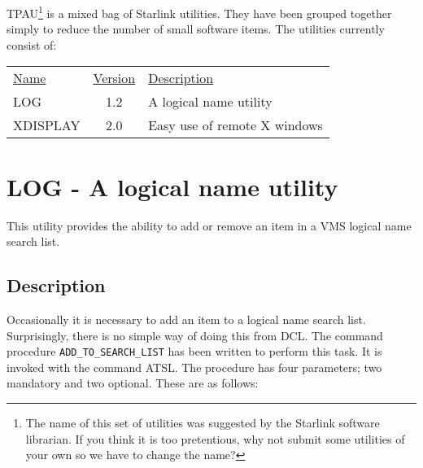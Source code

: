 TPAU\footnote{The name of this set of utilities was suggested by the Starlink
software librarian. If you think it is too pretentious, why not submit some
utilities of your own so we have to change the name?} is a mixed bag of
Starlink utilities. They have been grouped together simply to reduce the number
of small software items. The utilities currently consist of:

\begin{tabular}{lcl}
\underline{Name} & \underline{Version} & \underline{Description} \\
LOG & 1.2 & A logical name utility \\
XDISPLAY & 2.0 & Easy use of remote X windows \\
\end{tabular}


\section{LOG - A logical name utility}

This utility provides the ability to add or remove an item in a VMS logical
name search list.

\subsection{Description}

Occasionally it is necessary to add an item to a logical name search list.
Surprisingly, there is no simple way of doing this from DCL. The command
procedure {\tt ADD\_TO\_SEARCH\_LIST} has been written to perform this task. It
is invoked with the command ATSL. The procedure has four parameters; two
mandatory and two optional. These are as follows:

